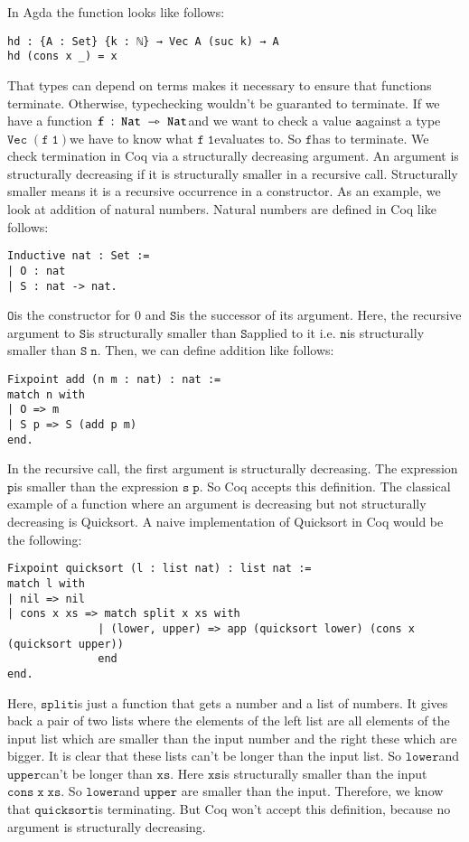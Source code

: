 \documentclass[a4paper,cleardoubleempty,BCOR1cm]{scrbook}
\begin{document}
In Agda the function looks like follows:
\begin{verbatim}
hd : {A : Set} {k : ℕ} → Vec A (suc k) → A
hd (cons x _) = x
\end{verbatim}
That types can depend on terms makes it necessary to ensure that functions
\linebreak terminate. Otherwise, typechecking wouldn't be guaranted to terminate. If we have a
function \linebreak $\mathtt{f\;:\;Nat\;\rightarrowtriangle\;Nat}$\;and we want to check a value $\mathtt{a}$\;against a type
$\mathtt{Vec\;(f\;1)}$\;we have to know what $\mathtt{f\;1}$\;evaluates to. So $\mathtt{f}$\;has to terminate.
We check termination in Coq via a structurally decreasing argument. An argument
is structurally decreasing if it is structurally smaller in a recursive call.
Structurally smaller means it is a recursive occurrence in a constructor. As an
example, we look at addition of natural numbers. Natural numbers are defined
in Coq like follows:
\begin{verbatim}
Inductive nat : Set :=
| O : nat
| S : nat -> nat.
\end{verbatim}
$\mathtt{O}$\;is the constructor for 0 and $\mathtt{S}$\;is the successor of its argument. Here,
the recursive argument to $\mathtt{S}$\;is structurally smaller than $\mathtt{S}$\;applied to it i.e.
$\mathtt{n}$\;is structurally smaller than $\mathtt{S\;n}$. Then, we can define addition like follows:
\begin{verbatim}
Fixpoint add (n m : nat) : nat :=
match n with
| O => m
| S p => S (add p m)
end.
\end{verbatim}
In the recursive call, the first argument is structurally decreasing. The
expression $\mathtt{p}$\;is smaller than the expression $\mathtt{s\;p}$. So Coq accepts this
definition. The classical example of a function where an argument is
decreasing but not structurally decreasing is Quicksort. A naive implementation
of Quicksort in Coq would be the following:
\begin{verbatim}
Fixpoint quicksort (l : list nat) : list nat :=
match l with
| nil => nil
| cons x xs => match split x xs with
              | (lower, upper) => app (quicksort lower) (cons x (quicksort upper))
              end
end.
\end{verbatim}
Here, $\mathtt{split}$\;is just a function that gets a number and a list of numbers. It
gives back a pair of two lists where the elements of the left list are all
elements of the input list which are smaller than the input number and the
right these which are bigger. It is clear that these lists can't be longer
than the input list. So $\mathtt{lower}$\;and $\mathtt{upper}$\;can't be longer than $\mathtt{xs}$. Here
$\mathtt{xs}$\;is structurally smaller than the input $\mathtt{cons\;x\;xs}$. So $\mathtt{lower}$\;and $\mathtt{upper}$
are smaller than the input. Therefore, we know that $\mathtt{quicksort}$\;is terminating.
But Coq won't accept this definition, because no argument is structurally decreasing.
\end{document}
